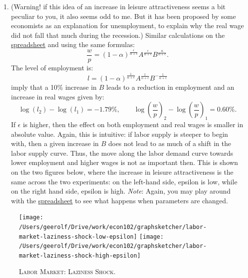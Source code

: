 \documentclass[]{book}
\providecommand{\tightlist}{%
  \setlength{\itemsep}{0pt}\setlength{\parskip}{0pt}}
\begin{document}
\begin{enumerate}
\def\labelenumi{\arabic{enumi}.}
\setcounter{enumi}{7}
\tightlist
\item
  (Warning! if this idea of an increase in leisure attractiveness seems
  a bit peculiar to you, it also seems odd to me. But it has been
  proposed by some economists as an explanation for unemployment, to
  explain why the real wage did not fall that much during the
  recession.) Similar calculations on the
  \href{https://docs.google.com/spreadsheets/d/1h9JJD8K2_IE166gdj78waf0zu4YDY9Rp3r5oiJR_06s/edit?usp=sharing}{spreadsheet}
  and using the same formulas:
  \[\frac{w}{p} = (1-\alpha)^{\frac{\epsilon}{\alpha+\epsilon}}A^{\frac{\epsilon}{\alpha+\epsilon}} B^{\frac{\alpha}{\alpha+\epsilon}}.\]
  The level of employment is:
  \[l= (1-\alpha)^{\frac{1}{\alpha+\epsilon}}A^{\frac{1}{\alpha+\epsilon}} B^{-\frac{1}{\alpha+\epsilon}}\]
  imply that a 10\% increase in \(B\) leads to a reduction in employment
  and an increase in real wages given by:
  \[\log(l_2)-\log(l_1)=-1.79\%, \qquad \log\left(\frac{w}{p}\right)_2-\log\left(\frac{w}{p}\right)_1=0.60\%.\]
  If \(\epsilon\) is higher, then the effect on both employment and real
  wages is smaller in absolute value. Again, this is intuitive: if labor
  supply is steeper to begin with, then a given increase in \(B\) does
  not lead to as much of a shift in the labor supply curve. Thus, the
  move along the labor demand curve towards lower employment and higher
  wages is not as important then. This is shown on the two figures
  below, where the increase in leisure attractiveness is the same across
  the two experiments: on the left-hand side, epsilon is low, while on
  the right hand side, epsilon is high. \emph{Note}: Again, you may play
  around with the
  \href{https://docs.google.com/spreadsheets/d/1h9JJD8K2_IE166gdj78waf0zu4YDY9Rp3r5oiJR_06s/edit?usp=sharing}{spreadsheet}
  to see what happens when parameters are changed.
\end{enumerate}



\begin{figure}

{\centering \texttt{[image: /Users/geerolf/Drive/work/econ102/graphsketcher/labor-market-laziness-shock-low-epsilon]} \texttt{[image: /Users/geerolf/Drive/work/econ102/graphsketcher/labor-market-laziness-shock-high-epsilon]} 

}

\caption{\textsc{Labor Market: Laziness Shock}.}\label{fig:labor-market-laziness-shock}
\end{figure}
\end{document}
